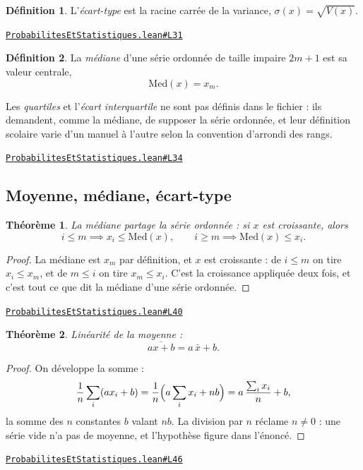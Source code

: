 \documentclass[11pt,a4paper]{article}
\theoremstyle{definition}
\newtheorem{definition}{Définition}
\theoremstyle{plain}
\newtheorem{theoreme}{Théorème}
\newcommand{\source}[2]{\par\smallskip\noindent\hfill{\footnotesize\href{#1}{\texttt{#2}}}\par\smallskip}
\begin{document}
\begin{definition}
L'\emph{écart-type} est la racine carrée de la variance,
$\sigma(x) = \sqrt{V(x)}$.
\end{definition}
\source{https://github.com/Commutator-IO/learn-lean/blob/main/cours/02-lycee/09-probabilites-et-statistiques/ProbabilitesEtStatistiques.lean\#L31}{ProbabilitesEtStatistiques.lean\#L31}

\begin{definition}
La \emph{médiane} d'une série ordonnée de taille impaire $2m + 1$ est sa valeur centrale,
\[ \mathrm{Med}(x) = x_m . \]

\medskip\noindent
Les \emph{quartiles} et l'\emph{écart interquartile} ne sont pas définis dans le fichier :
ils demandent, comme la médiane, de supposer la série ordonnée, et leur définition scolaire
varie d'un manuel à l'autre selon la convention d'arrondi des rangs.
\end{definition}
\source{https://github.com/Commutator-IO/learn-lean/blob/main/cours/02-lycee/09-probabilites-et-statistiques/ProbabilitesEtStatistiques.lean\#L34}{ProbabilitesEtStatistiques.lean\#L34}

\subsection{Moyenne, médiane, écart-type}

\begin{theoreme}
La médiane partage la série ordonnée : si $x$ est croissante, alors
\[ i \le m \implies x_i \le \mathrm{Med}(x) , \qquad
   i \ge m \implies \mathrm{Med}(x) \le x_i . \]
\end{theoreme}

\begin{proof}
La médiane est $x_m$ par définition, et $x$ est croissante : de $i \le m$ on tire
$x_i \le x_m$, et de $m \le i$ on tire $x_m \le x_i$. C'est la croissance appliquée deux
fois, et c'est tout ce que dit la médiane d'une série ordonnée.
\end{proof}
\source{https://github.com/Commutator-IO/learn-lean/blob/main/cours/02-lycee/09-probabilites-et-statistiques/ProbabilitesEtStatistiques.lean\#L40}{ProbabilitesEtStatistiques.lean\#L40}

\begin{theoreme}
Linéarité de la moyenne :
\[ \overline{ax + b} = a\,\bar x + b . \]
\end{theoreme}

\begin{proof}
On développe la somme :
\[ \frac{1}{n}\sum_i (a x_i + b)
   = \frac{1}{n}\Bigl(a\sum_i x_i + nb\Bigr)
   = a\,\frac{\sum_i x_i}{n} + b , \]
la somme des $n$ constantes $b$ valant $nb$. La division par $n$ réclame $n \ne 0$ : une
série vide n'a pas de moyenne, et l'hypothèse figure dans l'énoncé.
\end{proof}
\source{https://github.com/Commutator-IO/learn-lean/blob/main/cours/02-lycee/09-probabilites-et-statistiques/ProbabilitesEtStatistiques.lean\#L46}{ProbabilitesEtStatistiques.lean\#L46}
\end{document}
